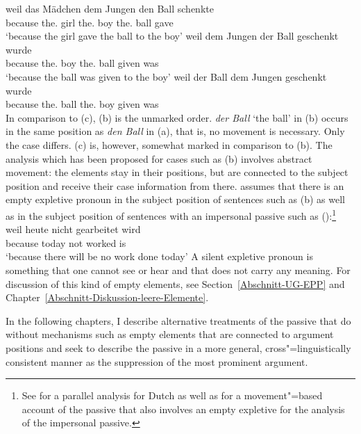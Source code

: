 \eal
\label{ex-passive-German-no-movement}
\ex 
\gll weil das Mädchen dem Jungen den Ball schenkte\\
     because the.\nom{} girl the.\dat{} boy the.\acc{} ball gave\\
\glt `because the girl gave the ball to the boy'
\ex 
\gll weil dem Jungen der Ball geschenkt wurde\\
	 because the.\dat{} boy the.\nom{} ball given was\\
\glt `because the ball was given to the boy'
\ex 
\gll weil der Ball dem Jungen geschenkt wurde\\
     because the.\nom{} ball the.\dat{} boy given was\\
\zl
In comparison to (c), (b) is the unmarked order. \emph{der Ball} `the ball' in (b) occurs
in the same position as \emph{den Ball} in (a), that is, no movement is necessary. Only the case differs.
(c) is, however, somewhat marked in comparison to (b). The analysis which has been proposed for
cases such as (b) involves abstract movement: the elements stay in their positions, but are connected to
the subject position and receive their case information from there. \citet[]{Grewendorf93}
assumes that there is an empty expletive pronoun
in the subject position of sentences such as (b) as well as in the subject position of sentences with an
impersonal passive such as ():\footnote{
	See  for a parallel analysis for Dutch as well as 
	 for a movement"=based account of the passive that also involves an
        empty expletive for the analysis of the impersonal passive.
}
\ea
\gll weil heute nicht gearbeitet wird\\
	 because today not worked is\\
\glt `because there will be no work done today'
\z
A silent expletive pronoun is something that one cannot see or hear and that does not carry any meaning. For discussion of 
this kind of empty elements, see Section~\ref{Abschnitt-UG-EPP} and Chapter~\ref{Abschnitt-Diskussion-leere-Elemente}.

In the following chapters, I describe alternative treatments of the passive that do without mechanisms such as
empty elements that are connected to argument positions and seek to describe the passive in a more
general, cross"=linguistically consistent manner as the suppression of the most prominent argument.

